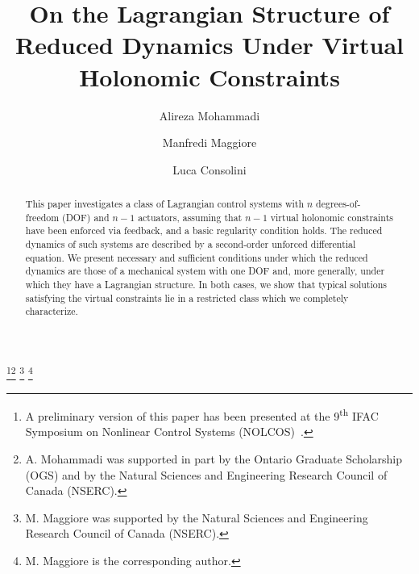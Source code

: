 
\usepackage{amsmath,amsfonts,array,enumerate,tikz}
\usepackage[dvips]{epsfig}
\usepackage{amssymb,psfrag,pdfsync}
\usepackage{amsrefs}

\newtheorem{prob}{Inverse Lagrangian Problem}
\theoremstyle{definition}
\newtheorem{theorem}{Theorem}[section]
\newtheorem{lemma}[theorem]{Lemma}
\newtheorem{corollary}[theorem]{Corollary}
\newtheorem{proposition}[theorem]{Proposition}
\newtheorem{definition}[theorem]{Definition}
\newtheorem{remark}[theorem]{Remark}
\newtheorem{assumption}[theorem]{Assumption}
\newtheorem{example}[theorem]{Example}
\newtheorem{procedure}[theorem]{Procedure}

\usepackage{color}

\title{On the Lagrangian Structure of Reduced Dynamics Under Virtual
	Holonomic Constraints}\thanks{A preliminary version of this
	paper has been presented at
	the 9\textsuperscript{th} IFAC Symposium on Nonlinear Control Systems (NOLCOS)~\cite{MohMagCon13_1}.}\thanks{ A. Mohammadi was supported
	in part by the Ontario Graduate Scholarship (OGS) and by the
	Natural Sciences and Engineering Research Council of Canada
	(NSERC).}
\thanks{M. Maggiore was supported by the
	Natural Sciences and Engineering Research Council of Canada
	(NSERC).}
\thanks{M. Maggiore is the corresponding author.}
\author{Alireza Mohammadi}\address{Department of Electrical and Computer
	Engineering, University of Toronto, 10 King's College Road, Toronto,
	ON, M5S 3G4, Canada; alireza.mohammadi@mail.utoronto.ca \& maggiore@ece.utoronto.ca}
\author{Manfredi Maggiore}
\author{Luca Consolini}\address{Dipartimento di Ingegneria
	dell'Informazione, Via Usberti 181/a, 43124 Parma, Italy; lucac@ce.unipr.it}
\begin{abstract} This paper investigates a class of Lagrangian control systems with $n$
	degrees-of-freedom (DOF) and $n-1$ actuators, assuming that $n-1$
	virtual holonomic constraints have been enforced via feedback, and a
	basic regularity condition holds.  The reduced dynamics of such
	systems are described by a second-order unforced differential
	equation. We present necessary and sufficient conditions under which
	the reduced dynamics are those of a mechanical system with one DOF
	and, more generally, under which they have a Lagrangian structure. In
	both cases, we show that typical solutions satisfying the virtual
	constraints lie in a restricted class which we completely
	characterize. \end{abstract}
\maketitle
